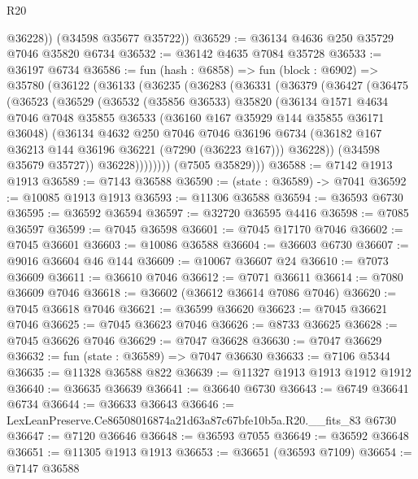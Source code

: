 \begin{lexlean}{R20}
\begin{coremodule}
{          @36228))
      (@34598 @35677 @35722))
@36529 := @36134 @4636 @250 @35729 @7046 @35820 @6734
@36532 := @36142 @4635 @7084 @35728
@36533 := @36197 @6734
@36586 := fun (hash : @6858) =>
  fun (block : @6902) =>
  @35780
    (@36122
      (@36133
        (@36235
          (@36283
            (@36331
              (@36379
                (@36427
                  (@36475
                    (@36523
                      (@36529
                        (@36532
                          (@35856 @36533)
                          @35820
                          (@36134
                            @1571
                            @4634
                            @7046
                            @7048
                            @35855
                            @36533
                            (@36160 @167 @35929 @144 @35855 @36171 @36048)
                            (@36134
                              @4632
                              @250
                              @7046
                              @7046
                              @36196
                              @6734
                              (@36182 @167 @36213 @144 @36196 @36221 (@7290 (@36223 @167)))
                              @36228))
                          (@34598 @35679 @35727))
                        @36228))))))))
        (@7505 @35829)))
@36588 := @7142 @1913 @1913
@36589 := @7143 @36588
@36590 := (state : @36589) -> @7041
@36592 := @10085 @1913 @1913
@36593 := @11306 @36588
@36594 := @36593 @6730
@36595 := @36592 @36594
@36597 := @32720 @36595 @4416
@36598 := @7085 @36597
@36599 := @7045 @36598
@36601 := @7045 @17170 @7046
@36602 := @7045 @36601
@36603 := @10086 @36588
@36604 := @36603 @6730
@36607 := @9016 @36604 @46 @144
@36609 := @10067 @36607 @24
@36610 := @7073 @36609
@36611 := @36610 @7046
@36612 := @7071 @36611
@36614 := @7080 @36609 @7046
@36618 := @36602 (@36612 @36614 @7086 @7046)
@36620 := @7045 @36618 @7046
@36621 := @36599 @36620
@36623 := @7045 @36621 @7046
@36625 := @7045 @36623 @7046
@36626 := @8733 @36625
@36628 := @7045 @36626 @7046
@36629 := @7047 @36628
@36630 := @7047 @36629
@36632 := fun (state : @36589) => @7047 @36630
@36633 := @7106 @5344
@36635 := @11328 @36588 @822
@36639 := @11327 @1913 @1913 @1912 @1912
@36640 := @36635 @36639
@36641 := @36640 @6730
@36643 := @6749 @36641 @6734
@36644 := @36633 @36643
@36646 := LexLeanPreserve.Ce86508016874a21d63a87c67bfe10b5a.R20.__fits_83 @6730
@36647 := @7120 @36646
@36648 := @36593 @7055
@36649 := @36592 @36648
@36651 := @11305 @1913 @1913
@36653 := @36651 (@36593 @7109)
@36654 := @7147 @36588
}
\end{coremodule}
\end{lexlean}
